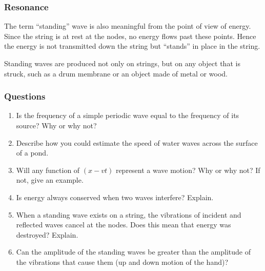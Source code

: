 \documentclass[]{beamer}
\begin{document}

\begin{frame}
\frametitle{Resonance}

 The term “standing” wave is also meaningful from the point of view
of energy. Since the string is at rest at the nodes, no energy flows past these points.
Hence the energy is not transmitted down the string but “stands” in place in the string.
\pause
\vspace{3mm}

Standing waves are produced not only on strings, but on any object that is
struck, such as a drum membrane or an object made of metal or wood.



  \end{frame}






\begin{frame}
\frametitle{Questions}

\begin{enumerate}
\item Is the frequency of a simple periodic wave equal to the
frequency of its source? Why or why not?

\pause
\item Describe how you could estimate the speed of water waves
across the surface of a pond.
\pause
\item Will any function of $(x- v t)$ represent a
wave motion? Why or why not? If not, give an example.
\pause

\item Is energy always conserved when two waves interfere?
Explain.
\pause
\item When a standing wave exists on a string, the vibrations of
incident and reflected waves cancel at the nodes. Does this
mean that energy was destroyed? Explain.

\pause

\item Can the amplitude of the standing waves  be
greater than the amplitude of the vibrations that cause them
(up and down motion of the hand)?


\end{enumerate}

  \end{frame}
\end{document}
